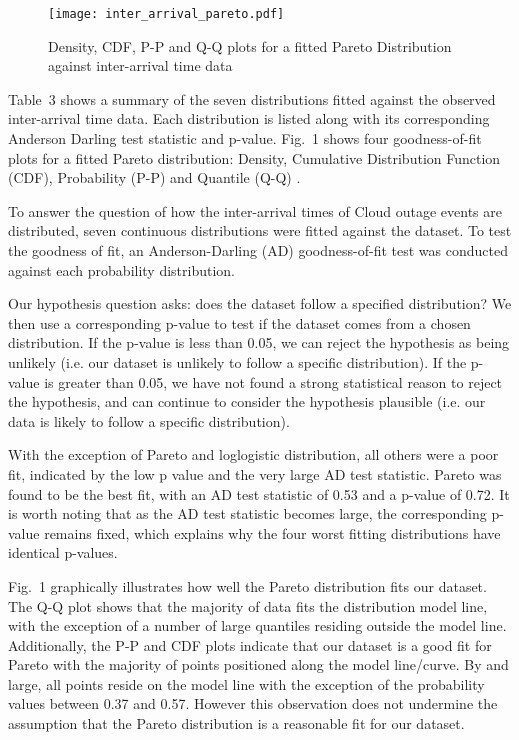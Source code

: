 \documentclass[5p]{elsarticle}
\begin{document}
\begin{figure*}[]
\begin{center}
\texttt{[image: inter\_arrival\_pareto.pdf]} 
\caption{Density, CDF, P-P and Q-Q plots for a fitted Pareto Distribution against inter-arrival time data}
\end{center}
\label{fig:outagedistribution}
\end{figure*}

Table~3 shows a summary of the seven distributions fitted against the observed inter-arrival time data. Each distribution is listed along with its corresponding Anderson Darling test statistic and p-value. Fig.~1 shows four goodness-of-fit plots for a fitted Pareto distribution: Density, Cumulative Distribution Function (CDF), Probability (P-P) \cite{gibbons2011nonparametric}  and Quantile (Q-Q) \cite{wilk1968probability}.  


To answer the question of how the inter-arrival times of Cloud outage events are distributed, seven continuous distributions were fitted against the dataset. To test the goodness of fit, an Anderson-Darling (AD) goodness-of-fit test was conducted against each probability distribution. 

Our hypothesis question asks: does the dataset follow a specified distribution? We then use a corresponding p-value to test if the dataset comes from a chosen distribution. If the p-value is less than 0.05, we can reject the hypothesis as being unlikely (i.e. our dataset is unlikely to follow a specific distribution). If the p-value is greater than 0.05, we have not found a strong statistical reason to reject the hypothesis, and can continue to consider the hypothesis plausible (i.e. our data is likely to follow a specific distribution). 


With the exception of Pareto and loglogistic distribution, all others were a poor fit, indicated by the low p value and the very large AD test statistic. Pareto was found to be the best fit, with an AD test statistic of 0.53 and a p-value of 0.72. It is worth noting that as the AD test statistic becomes large, the corresponding p-value remains fixed, which explains why the four worst fitting distributions have identical p-values.

Fig.~1 graphically illustrates how well the Pareto distribution fits our dataset. The Q-Q plot shows that the majority of data fits the distribution model line, with the exception of a number of large quantiles residing outside the model line. Additionally, the P-P and CDF plots indicate that our dataset is a good fit for Pareto with the majority of points positioned along the model line/curve. By and large, all points reside on the model line with the exception of the probability values between 0.37 and 0.57. However this observation does not undermine the assumption that the Pareto distribution is a reasonable fit for our dataset. 
\end{document}
